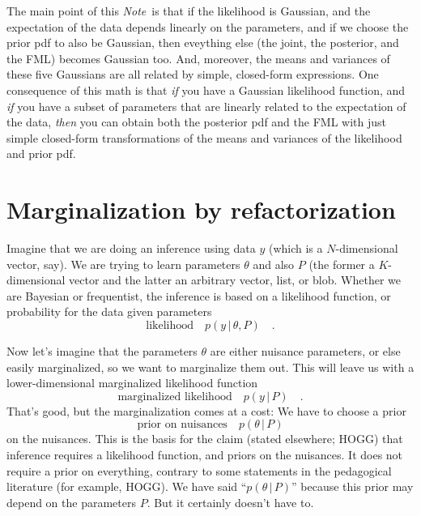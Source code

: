 \documentclass[12pt, letterpaper]{article}
\newcommand{\documentname}{\textsl{Note}}
\newcommand{\acronym}[1]{\small{#1}}
\newcommand{\FML}{\acronym{FML}}
\newcommand{\given}{\,|\,}
\begin{document}
The main point of this \documentname\ is that if the likelihood is
Gaussian, and the expectation of the data depends linearly on the
parameters, and if we choose the prior pdf to also be Gaussian, then
eveything else (the joint, the posterior, and the \FML) becomes
Gaussian too.
And, moreover, the means and variances of these five Gaussians are all
related by simple, closed-form expressions.
One consequence of this math is that \emph{if} you have a Gaussian
likelihood function, and \emph{if} you have a subset of parameters
that are linearly related to the expectation of the data, \emph{then}
you can obtain both the posterior pdf and the FML with just simple
closed-form transformations of the means and variances of the
likelihood and prior pdf.

\section{Marginalization by refactorization}

Imagine that we are doing an inference using data $y$ (which is a
$N$-dimensional vector, say).
We are trying to learn parameters $\theta$ and also $P$ (the former a
$K$-dimensional vector and the latter an arbitrary vector, list,
or blob.
Whether we are Bayesian or frequentist, the inference is based on
a likelihood function, or probability for the data given parameters
\begin{equation}
\mbox{likelihood} \quad p(y\given\theta,P)
\quad .
\end{equation}

Now let's imagine that the parameters $\theta$ are either nuisance
parameters, or else easily marginalized, so we want to marginalize
them out.
This will leave us with a lower-dimensional marginalized likelihood
function
\begin{equation}
\mbox{marginalized likelihood} \quad p(y\given P)
\quad .
\end{equation}
That's good, but the marginalization comes at a cost:
We have to choose a prior
\begin{equation}
\mbox{prior on nuisances} \quad p(\theta\given P)
\end{equation}
on the nuisances.
This is the basis for the claim (stated elsewhere; HOGG) that
inference requires a likelihood function, and priors on the nuisances.
It does not require a prior on everything, contrary to some statements
in the pedagogical literature (for example, HOGG).
We have said ``$p(\theta\given P)$'' because this prior may depend on
the parameters $P$. But it certainly doesn't have to.
\end{document}
